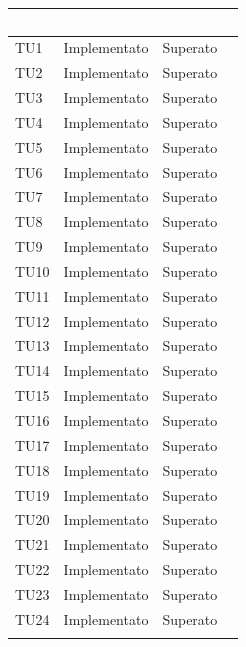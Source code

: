 \begin{longtable}{|>{\centering\arraybackslash}m{1.6cm}|>{\centering\arraybackslash}m{6.41cm}|>{\centering\arraybackslash}m{3.1cm}| c |}		
	\rowcolor{LightBlue}
	\textbf{\textcolor{white}{Test}}
	& \textbf{\textcolor{white}{Stato}}
	& \textbf{\textcolor{white}{Esito}}\\
	\hline
	TU1 & Implementato & Superato \\ \hline
	TU2 & Implementato & Superato  \\ \hline
		\rowcolor{LightGray}
	TU3 & Implementato & Superato  \\ \hline
	TU4 & Implementato & Superato  \\ \hline
		\rowcolor{LightGray}
	TU5 & Implementato & Superato  \\ \hline
	TU6 & Implementato & Superato  \\ \hline
		\rowcolor{LightGray}
	TU7 & Implementato & Superato  \\ \hline
	TU8 & Implementato & Superato  \\ \hline
		\rowcolor{LightGray}
	TU9 & Implementato & Superato  \\ \hline
	TU10 & Implementato & Superato  \\ \hline
		\rowcolor{LightGray}
	TU11 & Implementato & Superato  \\ \hline		
	TU12 & Implementato & Superato  \\ \hline
		\rowcolor{LightGray}
	TU13 & Implementato & Superato  \\ \hline
	TU14 & Implementato & Superato \\ \hline
		\rowcolor{LightGray}
	TU15 & Implementato & Superato  \\ \hline
	TU16 & Implementato & Superato \\ \hline
		\rowcolor{LightGray}
	TU17 & Implementato & Superato \\ \hline
	TU18 & Implementato & Superato \\ \hline
		\rowcolor{LightGray}
	TU19 & Implementato & Superato \\ \hline
	TU20 & Implementato & Superato \\ \hline
		\rowcolor{LightGray}
	TU21 & Implementato & Superato \\ \hline
	TU22 & Implementato & Superato \\ \hline
		\rowcolor{LightGray}
	TU23 & Implementato & Superato \\ \hline
	TU24 & Implementato & Superato \\ \hline
		\rowcolor{LightGray}

\end{longtable}
